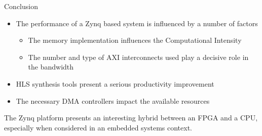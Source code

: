 \documentclass{beamer}
\begin{document}
\begin{frame}{Conclusion}
  \begin{itemize}
  \item The performance of a Zynq based system is influenced by a number of factors
    \begin{itemize}
    \item The memory implementation influences the Computational Intensity
    \item The number and type of AXI interconnects used play a decisive role in the bandwidth
    \end{itemize}
  \item HLS synthesis tools present a serious productivity improvement
  \item The necessary DMA controllers impact the available resources
  \end{itemize}
The Zynq platform presents an interesting hybrid between an FPGA and a CPU, especially when considered in an embedded systems context.
\end{frame}
\end{document}
